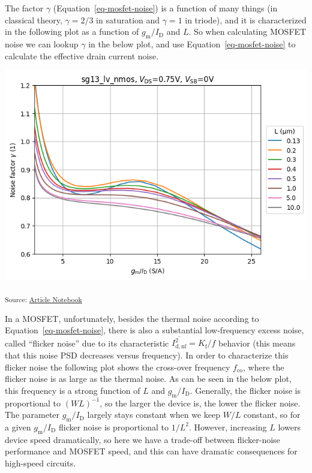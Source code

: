 \documentclass[
  a4paper,
  DIV=11,
  numbers=noendperiod]{scrartcl}
\begin{document}
The factor \(\gamma\) (Equation~\ref{eq-mosfet-noise}) is a function of
many things (in classical theory, \(\gamma = 2/3\) in saturation and
\(\gamma = 1\) in triode), and it is characterized in the following plot
as a function of \(g_\mathrm{m}/I_\mathrm{D}\) and \(L\). So when
calculating MOSFET noise we can lookup \(\gamma\) in the below plot, and
use Equation~\ref{eq-mosfet-noise} to calculate the effective drain
current noise.

\includegraphics{index_files/figure-latex/.-sizing-techsweep_sg13_plots_nmos-cell-13-output-1.png}

\textsubscript{Source:
\href{https://iic-jku.github.io/analog-circuit-design/index.qmd.html}{Article
Notebook}}

In a MOSFET, unfortunately, besides the thermal noise according to
Equation~\ref{eq-mosfet-noise}, there is also a substantial
low-frequency excess noise, called ``flicker noise'' due to its
characteristic \(\overline{I_\mathrm{d,nf}^2} = K_\mathrm{f}/f\)
behavior (this means that this noise PSD decreases versus frequency). In
order to characterize this flicker noise the following plot shows the
cross-over frequency \(f_\mathrm{co}\), where the flicker noise is as
large as the thermal noise. As can be seen in the below plot, this
frequency is a strong function of \(L\) and
\(g_\mathrm{m}/I_\mathrm{D}\). Generally, the flicker noise is
proportional to \((W L)^{-1}\), so the larger the device is, the lower
the flicker noise. The parameter \(g_\mathrm{m}/I_\mathrm{D}\) largely
stays constant when we keep \(W/L\) constant, so for a given
\(g_\mathrm{m}/I_\mathrm{D}\) flicker noise is proportional to
\(1/L^2\). However, increasing \(L\) lowers device speed dramatically,
so here we have a trade-off between flicker-noise performance and MOSFET
speed, and this can have dramatic consequences for high-speed circuits.
\end{document}
